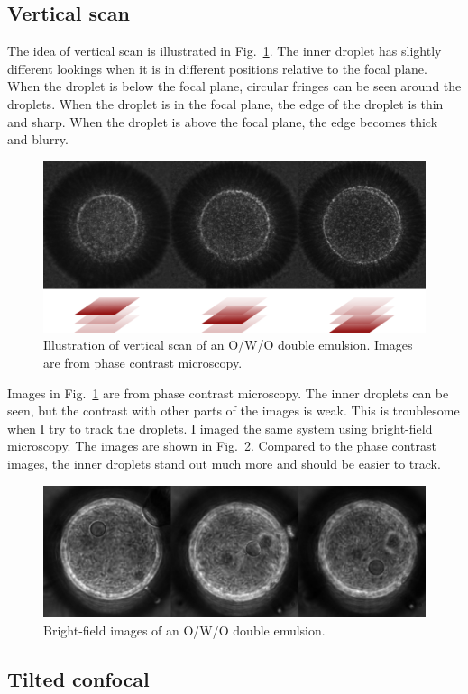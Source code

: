 \documentclass[onecolumn,aps, pre,amsmath,amssymb,longbibliography,11pt]{revtex4-2}
\begin{document}
\subsection{Vertical scan}
The idea of vertical scan is illustrated in Fig.~\ref{fig:manual-scan}.
The inner droplet has slightly different lookings when it is in different positions relative to the focal plane.
When the droplet is below the focal plane, circular fringes can be seen around the droplets.
When the droplet is in the focal plane, the edge of the droplet is thin and sharp.
When the droplet is above the focal plane, the edge becomes thick and blurry.

\begin{figure}[h]
  \includegraphics{manual-scan.png}
  \caption{Illustration of vertical scan of an O/W/O double emulsion. Images are from phase contrast microscopy.}
  \label{fig:manual-scan}
\end{figure}

Images in Fig.~\ref{fig:manual-scan} are from phase contrast microscopy.
The inner droplets can be seen, but the contrast with other parts of the images is weak.
This is troublesome when I try to track the droplets.
I imaged the same system using bright-field microscopy.
The images are shown in Fig.~\ref{fig:bright-field-images}.
Compared to the phase contrast images, the inner droplets stand out much more and should be easier to track.

\begin{figure}[h]
  \includegraphics{bright-field-images.png}
  \caption{Bright-field images of an O/W/O double emulsion.}
  \label{fig:bright-field-images}
\end{figure}


\subsection{Tilted confocal}
\end{document}
